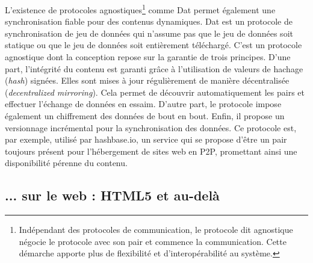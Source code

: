 L'existence de protocoles agnostiques\footnote{Indépendant des 
protocoles de communication, le protocole dit \og agnostique\fg{} négocie le 
protocole avec son pair et commence la communication. Cette démarche 
apporte plus de flexibilité et d'interopérabilité au système.} comme Dat 
\cite{Ogden2017} permet également une synchronisation fiable pour des 
contenus dynamiques. Dat est un protocole de synchronisation de jeu de données 
qui n'assume pas que le jeu de données soit statique ou que le jeu de données 
soit entièrement téléchargé. C'est un protocole agnostique dont la conception 
repose sur la garantie de trois principes. D'une part, l'intégrité du contenu est garanti grâce à l'utilisation de valeurs de hachage (\textit{hash}) signées. Elles sont mises à jour régulièrement de manière décentralisée (\textit{decentralized mirroring}). Cela permet de découvrir automatiquement les pairs et effectuer l'échange de données en essaim. D'autre part, le protocole impose également un chiffrement des données de bout en bout. Enfin, il propose un versionnage incrémental pour la 
synchronisation des données. Ce protocole est, par exemple, utilisé par 
hashbase.io, un service qui se propose d'être un pair toujours présent pour 
l'hébergement de sites web en \gls{P2P}, promettant ainsi une disponibilité 
pérenne du contenu. 


\subsection{... sur le web : HTML5 et au-delà}

